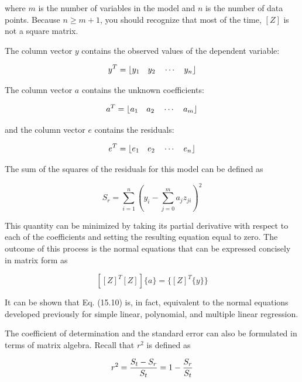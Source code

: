 \documentclass[../main.tex]{subfiles}
\begin{document}
\noindent where $m$ is the number of variables in the model and $n$ is the number of data points. Because $n \geqslant  m + 1$, you should recognize that most of the time, $[Z]$ is not a square matrix.

The column vector ${y}$ contains the observed values of the dependent variable:

\begin{equation}
	\notag
	{y}^T = \lfloor y_1 \quad  y_2 \quad \cdots \quad y_n \rfloor 
\end{equation}

\noindent The column vector ${a}$ contains the unknown coefficients:

\begin{equation}
	\notag
	{a}^T = \lfloor a_1 \quad  a_2 \quad \cdots \quad a_m \rfloor 
\end{equation}

\noindent and the column vector ${e}$ contains the residuals:

\begin{equation}
	\notag
	{e}^T = \lfloor e_1 \quad  e_2 \quad \cdots \quad e_n \rfloor 
\end{equation}

The sum of the squares of the residuals for this model can be defined as

\begin{equation}
	\tag{15.9}
	S_r = \sum^n_{i=1} {(y_i - \sum^m_{j=0} a_j z_{ji})}^2
\end{equation}

\noindent This quantity can be minimized by taking its partial derivative with respect to each of the
coefficients and setting the resulting equation equal to zero. The outcome of this process is
the normal equations that can be expressed concisely in matrix form as

\begin{equation}
	\tag{15.10}
	[{[Z]}^T [Z]] \{a\} = \{{[Z]}^T \{y\}\}
\end{equation}

\noindent It can be shown that Eq. (15.10) is, in fact, equivalent to the normal equations developed
previously for simple linear, polynomial, and multiple linear regression.

The coefficient of determination and the standard error can also be formulated in terms
of matrix algebra. Recall that $r^2$ is defined as

\begin{equation}
	\notag
	r^2 = \frac{S_t - S_r}{S_t} = 1 - \frac{S_r}{S_t}
\end{equation}
\end{document}
